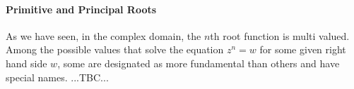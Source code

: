 






\paragraph{Primitive and Principal Roots}
As we have seen, in the complex domain, the $n$th root function is multi valued. Among the possible values that solve the equation $z^n = w$ for some given right hand side $w$, some are designated as more fundamental than others and have special names. ...TBC...







